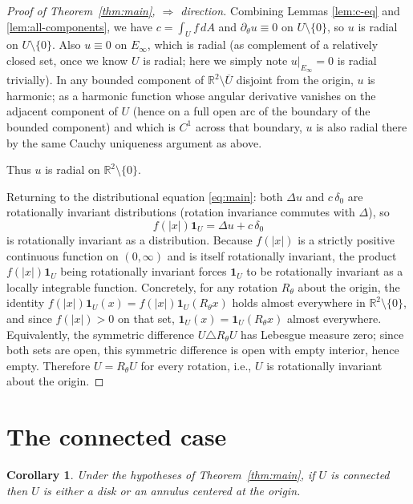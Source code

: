 \documentclass[11pt]{article}
\newtheorem{corollary}[theorem]{Corollary}
\newcommand{\R}{\mathbb R}
\newcommand{\1}{\mathbf 1}
\begin{document}
\begin{proof}[Proof of Theorem~\ref{thm:main}, $\Rightarrow$ direction]
Combining Lemmas \ref{lem:c-eq} and \ref{lem:all-components}, we have $c=\int_U f\,dA$ and
$\partial_\theta u\equiv 0$ on $U\setminus\{0\}$, so $u$ is radial on $U\setminus\{0\}$.
Also $u\equiv 0$ on $E_\infty$, which is radial (as complement of a relatively closed set,
once we know $U$ is radial; here we simply note $u|_{E_\infty}=0$ is radial trivially).
In any bounded component of $\R^2\setminus\overline U$ disjoint from the origin, $u$
is harmonic; as a harmonic function whose angular derivative
vanishes on the adjacent component of $U$ (hence on a full open arc of the boundary of
the bounded component) and which is $C^1$ across that boundary, $u$ is also radial there by
the same Cauchy uniqueness argument as above.

Thus $u$ is radial on $\R^2\setminus\{0\}$.

Returning to the distributional equation \eqref{eq:main}: both $\Delta u$ and $c\,\delta_0$
are rotationally invariant distributions (rotation invariance commutes with $\Delta$), so
\[
f(|x|)\1_U=\Delta u+c\,\delta_0
\]
is rotationally invariant as a distribution. Because $f(|x|)$ is a strictly positive
continuous function on $(0,\infty)$ and is itself rotationally invariant, the product
$f(|x|)\1_U$ being rotationally invariant forces $\1_U$ to be rotationally invariant as a
locally integrable function. Concretely, for any rotation $R_\theta$ about the origin, the
identity $f(|x|)\1_U(x)=f(|x|)\1_U(R_\theta x)$ holds almost everywhere in
$\R^2\setminus\{0\}$, and since $f(|x|)>0$ on that set, $\1_U(x)=\1_U(R_\theta x)$ almost
everywhere. Equivalently, the symmetric difference $U\triangle R_\theta U$ has Lebesgue
measure zero; since both sets are open, this symmetric difference is open with empty
interior, hence empty. Therefore $U=R_\theta U$ for every rotation, i.e., $U$ is
rotationally invariant about the origin.
\end{proof}

\section{The connected case}

\begin{corollary}\label{cor:connected}
Under the hypotheses of Theorem~\ref{thm:main}, if $U$ is connected then $U$ is either a
disk or an annulus centered at the origin.
\end{corollary}
\end{document}
